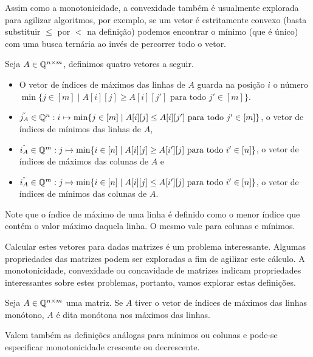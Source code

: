 Assim como a monotonicidade, a convexidade também é usualmente explorada para agilizar algoritmos, por exemplo, se um vetor é estritamente convexo (basta substituir $\leq$ por $<$ na definição) podemos encontrar o mínimo (que é único) com uma busca ternária ao invés de percorrer todo o vetor.  

\begin{defi}
Seja $A \in \mathbb{Q}^{n \times m}$, definimos quatro vetores a seguir.
    \begin{itemize}
        \item O vetor de índices de máximos das linhas de $A$ guarda na posição $i$ 
              o número $\min\{j \in [m] \mid A[i][j] \geq A[i][j'] \text{ para todo } j' \in [m]\}$. 
        \item $\check{j_A} \in \mathbb{Q}^n : i \mapsto \min\{j \in [m] \mid A[i][j] \leq A[i][j'] \text{ para todo } j' \in [m]\}$, o vetor de índices de mínimos das linhas de $A$,
        \item $\hat{i_A} \in \mathbb{Q}^m : j \mapsto \min\{i \in [n] \mid A[i][j] \geq A[i'][j] \text{ para todo } i' \in [n]\}$, o vetor de índices de máximos das colunas de $A$ e 
        \item $\check{i_A} \in \mathbb{Q}^m : j \mapsto \min\{i \in [n] \mid A[i][j] \leq A[i'][j] \text{ para todo } i' \in [n]\}$, o vetor de índices de mínimos das colunas de $A$.
    \end{itemize}

Note que o índice de máximo de uma linha é definido como o menor índice que contém o valor máximo daquela linha. O mesmo vale para colunas e mínimos.
\end{defi}

Calcular estes vetores para dadas matrizes é um problema interessante. Algumas propriedades das matrizes podem ser exploradas a fim de agilizar este cálculo. A monotonicidade, convexidade ou concavidade de matrizes indicam propriedades interessantes sobre estes problemas, portanto, vamos explorar estas definições.

\begin{defi}
Seja $A \in \mathbb{Q}^{n \times m}$ uma matriz. Se $A$ tiver o vetor de índices de máximos das linhas monótono, $A$ é dita monótona nos máximos das linhas. 

Valem também as definições análogas para mínimos ou colunas e pode-se especificar monotonicidade crescente ou decrescente.
\end{defi}

